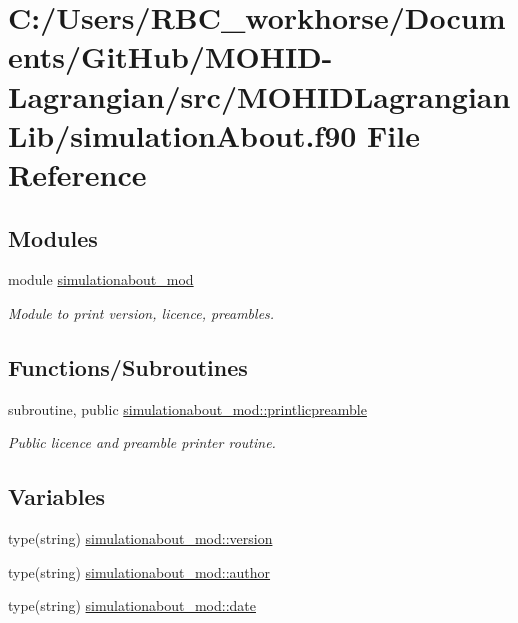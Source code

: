 \hypertarget{simulation_about_8f90}{}\section{C\+:/\+Users/\+R\+B\+C\+\_\+workhorse/\+Documents/\+Git\+Hub/\+M\+O\+H\+I\+D-\/\+Lagrangian/src/\+M\+O\+H\+I\+D\+Lagrangian\+Lib/simulation\+About.f90 File Reference}
\label{simulation_about_8f90}
\subsection*{Modules}
\begin{DoxyCompactItemize}
\item 
module \mbox{\hyperlink{namespacesimulationabout__mod}{simulationabout\+\_\+mod}}
\begin{DoxyCompactList}\small\item\em Module to print version, licence, preambles. \end{DoxyCompactList}\end{DoxyCompactItemize}
\subsection*{Functions/\+Subroutines}
\begin{DoxyCompactItemize}
\item 
subroutine, public \mbox{\hyperlink{namespacesimulationabout__mod_a4248c37e1b337cda7226a41aac346761}{simulationabout\+\_\+mod\+::printlicpreamble}}
\begin{DoxyCompactList}\small\item\em Public licence and preamble printer routine. \end{DoxyCompactList}\end{DoxyCompactItemize}
\subsection*{Variables}
\begin{DoxyCompactItemize}
\item 
type(string) \mbox{\hyperlink{namespacesimulationabout__mod_ab3a538e4f741e6ea5be60e667a966fda}{simulationabout\+\_\+mod\+::version}}
\item 
type(string) \mbox{\hyperlink{namespacesimulationabout__mod_a64b9a218dda33c3c5abdf4503b71e8a4}{simulationabout\+\_\+mod\+::author}}
\item 
type(string) \mbox{\hyperlink{namespacesimulationabout__mod_ab8debffcb94d9718e06501a71218ef26}{simulationabout\+\_\+mod\+::date}}
\end{DoxyCompactItemize}
